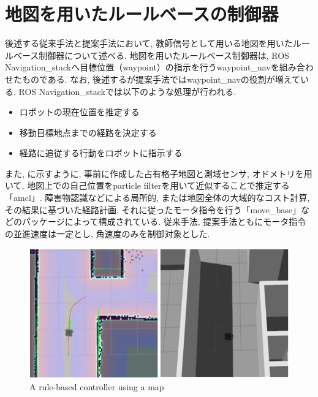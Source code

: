 
\section{地図を用いたルールベースの制御器}
後述する従来手法と提案手法において, 教師信号として用いる地図を用いたルールベース制御器について述べる. 地図を用いたルールベース制御器は, ROS Navigation\_stack\cite{navigation:online}へ目標位置（waypoint）の指示を行うwaypoint\_nav\cite{waypoint_nav:online}を組み合わせたものである. なお, 後述するが提案手法ではwaypoint\_navの役割が増えている. ROS Navigation\_stackでは以下のような処理が行われる. 

\begin{itemize}
  \item ロボットの現在位置を推定する
  \item 移動目標地点までの経路を決定する
  \item 経路に追従する行動をロボットに指示する
\end{itemize}

また, に示すように, 事前に作成した占有格子地図と測域センサ, オドメトリを用いて, 地図上での自己位置をparticle filterを用いて近似することで推定する「amcl」. 障害物認識などによる局所的, または地図全体の大域的なコスト計算, その結果に基づいた経路計画, それに従ったモータ指令を行う「move\_base」などのパッケージによって構成されている. 従来手法, 提案手法ともにモータ指令の並進速度は一定とし, 角速度のみを制御対象とした.

\vspace{1cm}

\begin{figure}[hbtp]
  \centering
 \includegraphics[keepaspectratio, scale=0.5]
      {images/rule-based.png}
 \caption{A rule-based controller using a map}
 \label{Fig:navigation}
\end{figure}

\newpage